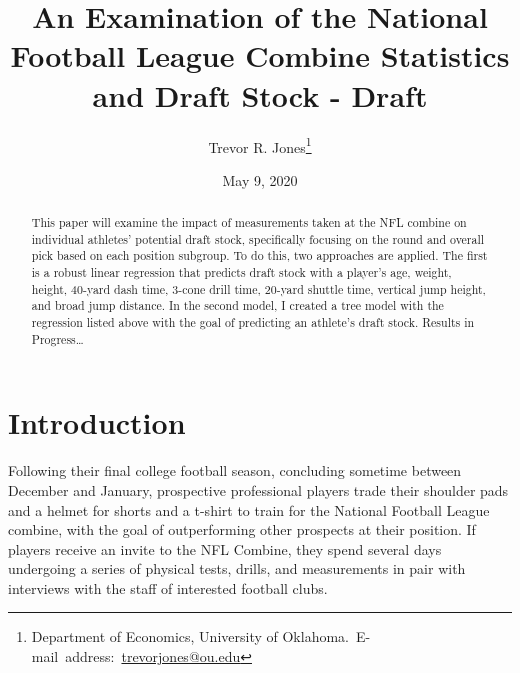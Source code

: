 \documentclass[12pt,english]{article}
\begin{document}
\begin{singlespace}
\title{An Examination of the National Football League Combine Statistics and Draft Stock - Draft}
\end{singlespace}


\author{Trevor R. Jones\thanks{Department of Economics, University of Oklahoma.\
E-mail~address:~\href{mailto:trevorjones@ou.edu}{trevorjones@ou.edu}}}

\date{May 9, 2020}

\maketitle

\begin{abstract}
\begin{singlespace}
This paper will examine the impact of measurements taken at the NFL combine on individual athletes’ potential draft stock, specifically focusing on the round and overall pick based on each position subgroup. To do this, two approaches are applied. The first is a robust linear regression that predicts draft stock with a player’s age, weight, height, 40-yard dash time, 3-cone drill time, 20-yard shuttle time, vertical jump height, and broad jump distance. In the second model, I created a tree model with the regression listed above with the goal of predicting an athlete’s draft stock. Results in Progress…
\end{singlespace}

\end{abstract}
\vfill{}


\pagebreak{}


\section{Introduction}\label{sec:intro}
Following their final college football season, concluding sometime between December and January, prospective professional players trade their shoulder pads and a helmet for shorts and a t-shirt to train for the National Football League combine, with the goal of outperforming other prospects at their position. If players receive an invite to the NFL Combine, they spend several days undergoing a series of physical tests, drills, and measurements in pair with interviews with the staff of interested football clubs. 
\end{document}

